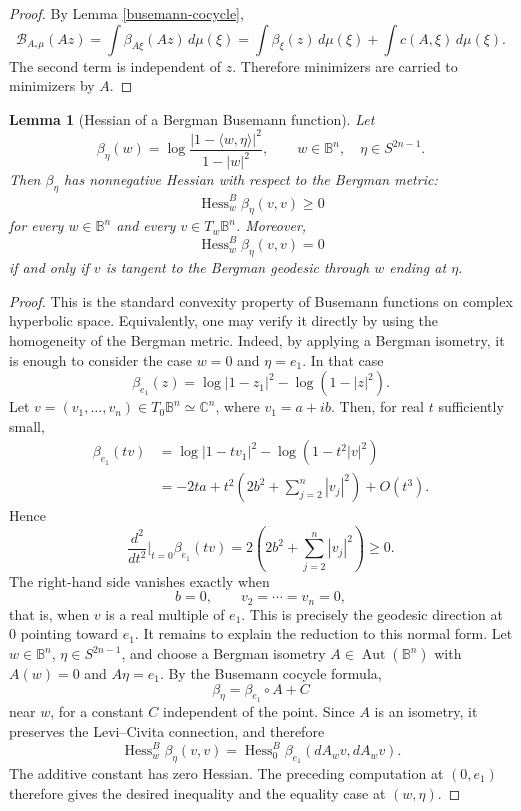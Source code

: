 \documentclass[11pt]{article}
\newcommand{\Hess}{\operatorname{Hess}}
\newtheorem{lemma}[theorem]{Lemma}
\theoremstyle{definition}
\theoremstyle{remark}
\theoremstyle{definition}
\newcommand{\B}{\mathbb B}
\newcommand{\C}{\mathbb C}
\newcommand{\Aut}{\operatorname{Aut}}
\begin{document}
\begin{proof}
By Lemma \ref{busemann-cocycle},
\[
        \mathcal B_{A_*\mu}(Az)
        =\int\beta_{A\xi}(Az)\,d\mu(\xi)
        =\int\beta_\xi(z)\,d\mu(\xi)+\int c(A,\xi)\,d\mu(\xi).
\]
The second term is independent of \(z\).  Therefore minimizers are carried to
minimizers by \(A\).
\end{proof}


\begin{lemma}[Hessian of a Bergman Busemann function]
Let
\[
        \beta_\eta(w)
        =
        \log
        \frac{|1-\langle w,\eta\rangle|^2}{1-|w|^2},
        \qquad w\in\B^n,\quad \eta\in S^{2n-1}.
\]
Then \(\beta_\eta\) has nonnegative Hessian with respect to the Bergman metric:
\[
        \operatorname{Hess}^{B}_w\beta_\eta(v,v)\ge 0
\]
for every \(w\in\B^n\) and every \(v\in T_w\B^n\). Moreover,
\[
        \operatorname{Hess}^{B}_w\beta_\eta(v,v)=0
\]
if and only if \(v\) is tangent to the Bergman geodesic through \(w\) ending at
\(\eta\).
\end{lemma}

\begin{proof}
This is the standard convexity property of Busemann functions on complex
hyperbolic space. Equivalently, one may verify it directly by using the
homogeneity of the Bergman metric. Indeed, by applying a Bergman isometry, it is
enough to consider the case \(w=0\) and \(\eta=e_1\). In that case
\[
        \beta_{e_1}(z)
        =
        \log |1-z_1|^2-\log(1-|z|^2).
\]
Let \(v=(v_1,\ldots,v_n)\in T_0\B^n\simeq\C^n\), where
\(v_1=a+ib\). Then, for real \(t\) sufficiently small,
\[
\begin{aligned}
        \beta_{e_1}(tv)
        &=
        \log |1-tv_1|^2-\log(1-t^2|v|^2)  \\
        &=
        -2ta
        +
        t^2\left(2b^2+\sum_{j=2}^n |v_j|^2\right)
        +
        O(t^3).
\end{aligned}
\]
Hence
\[
        \frac{d^2}{dt^2}\bigg|_{t=0}\beta_{e_1}(tv)
        =
        2\left(2b^2+\sum_{j=2}^n |v_j|^2\right)\ge 0.
\]
The right-hand side vanishes exactly when
\[
        b=0,\qquad v_2=\cdots=v_n=0,
\]
that is, when \(v\) is a real multiple of \(e_1\). This is precisely the
geodesic direction at \(0\) pointing toward \(e_1\). It remains to explain the reduction to this normal form.  Let
\(w\in\B^n\), \(\eta\in S^{2n-1}\), and choose a Bergman isometry
\(A\in\Aut(\B^n)\) with \(A(w)=0\) and \(A\eta=e_1\).  By the Busemann
cocycle formula,
\[
        \beta_\eta = \beta_{e_1}\circ A + C
\]
near \(w\), for a constant \(C\) independent of the point.  Since \(A\) is an
isometry, it preserves the Levi--Civita connection, and therefore
\[
        \Hess^B_w\beta_\eta(v,v)
        =
        \Hess^B_0\beta_{e_1}(dA_wv,dA_wv).
\]
The additive constant has zero Hessian.  The preceding computation at
\((0,e_1)\) therefore gives the desired inequality and the equality case at
\((w,\eta)\).
\end{proof}
\end{document}
